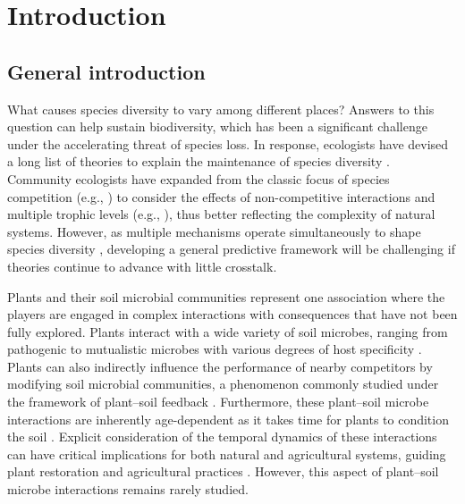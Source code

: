 \chapter{Introduction}
\fancyhead[LE, RO]{\thepage}
\fancyfoot{}
\renewcommand{\headrulewidth}{0pt}
\setlength{\parindent}{1cm}


\section{General introduction}
What causes species diversity to vary among different places? Answers to this question can help sustain biodiversity, which has been a significant challenge under the accelerating threat of species loss. In response, ecologists have devised a long list of theories to explain the maintenance of species diversity \citep{Vellend2016}. Community ecologists have expanded from the classic focus of species competition (e.g., \citealp{Gause1934}) to consider the effects of non-competitive interactions and multiple trophic levels (e.g., \citealp{Chesson2008b, Mccann2011, Bascompte2013}), thus better reflecting the complexity of natural systems. However, as multiple mechanisms operate simultaneously to shape species diversity \citep{Amarasekare2007}, developing a general predictive framework will be challenging if theories continue to advance with little crosstalk.
\par


Plants and their soil microbial communities represent one association where the players are engaged in complex interactions with consequences that have not been fully explored. Plants interact with a wide variety of soil microbes, ranging from pathogenic to mutualistic microbes with various degrees of host specificity \citep{Bever2010, vanderPutten2013}. Plants can also indirectly influence the performance of nearby competitors by modifying soil microbial communities, a phenomenon commonly studied under the framework of plant--soil feedback \citep{Bever1997, Bever2003}. Furthermore, these plant--soil microbe interactions are inherently age-dependent as it takes time for plants to condition the soil \citep{Kardol2013}. Explicit consideration of the temporal dynamics of these interactions can have critical implications for both natural and agricultural systems, guiding plant restoration and agricultural practices \citep{Kulmatiski2006, Mariotte2018}. However, this aspect of plant--soil microbe interactions remains rarely studied. 
\par 


